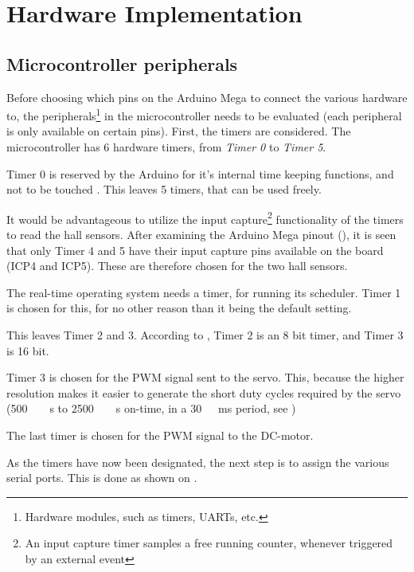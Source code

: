 \section{Hardware Implementation}
\subsection{Microcontroller peripherals}
Before choosing which pins on the Arduino Mega to connect the various hardware to, the peripherals\footnote{Hardware modules, such as timers, UARTs, etc.} in the microcontroller needs to be evaluated (each peripheral is only available on certain pins). First, the timers are considered. The microcontroller has 6 hardware timers, from \emph{Timer 0} to \emph{Timer 5}.

Timer 0  is reserved by the Arduino for it's internal time keeping functions, and not to be touched \cite{ArduinoPWM}. This leaves 5 timers, that can be used freely.

It would be advantageous to utilize the input capture\footnote{An input capture timer samples a free running counter, whenever triggered by  an external event}  functionality of the timers to read the hall sensors. After examining the Arduino Mega pinout (), it is seen that only Timer 4 and 5 have their input capture pins available on the board (ICP4 and ICP5). These are therefore chosen for the two hall sensors.
   
The real-time operating system  needs a timer, for running its scheduler. Timer 1 is chosen for this, for no other reason than it being the default setting.

This leaves Timer 2 and 3. According to \cite{Atmega}, Timer 2 is an 8 bit timer, and Timer 3 is 16 bit. 

Timer 3 is chosen for the PWM signal sent to the servo. This, because the higher resolution makes it easier to generate the short duty cycles required by the servo (\si{500\ \mu s} to \si{2500\ \mu s} on-time, in a \si{30\ ms} period, see )

The last timer is chosen for the PWM signal to the DC-motor.

As the timers have now been designated, the next step is to assign the various serial ports. This is done as shown on .


